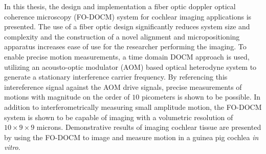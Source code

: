 % 
% 
%

In this thesis, the design and implementation a fiber optic doppler optical coherence microscopy (FO-DOCM) system for cochlear imaging applications is presented. The use of a fiber optic design significantly reduces system size and complexity and the construction of a novel alignment and micropositioning apparatus increases ease of use for the researcher performing the imaging. To enable precise motion measurements, a time domain DOCM approach is used, utilizing an acousto-optic modulator (AOM) based optical heterodyne system to generate a stationary interference carrier frequency. By referencing this intereference signal against the AOM drive signals, precise measurements of motions with magnitude on the order of $10$ picometers is shown to be possible. In addition to interferometrically measuring small amplitude motion, the FO-DOCM system is shown to be capable of imaging with a volumetric resolution of $10 \times 9 \times 9$ microns. Demonstrative results of imaging cochlear tissue are presented by using the FO-DOCM to image and measure motion in a guinea pig cochlea {\em in vitro}.

